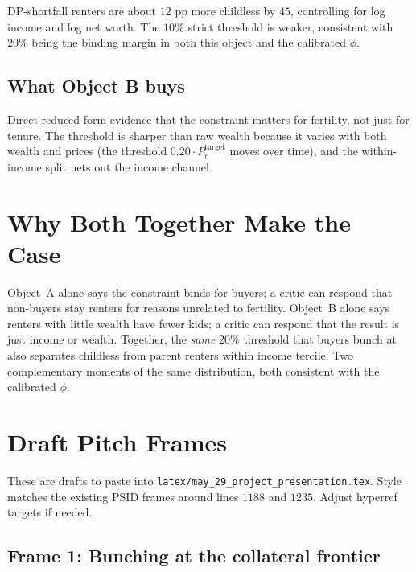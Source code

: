 \documentclass[11pt]{article}
\begin{document}
\noindent DP-shortfall renters are about $12$ pp more childless by $45$, controlling for log income and log net worth. The $10\%$ strict threshold is weaker, consistent with $20\%$ being the binding margin in both this object and the calibrated $\phi$.

\subsection*{What Object B buys}

Direct reduced-form evidence that the constraint matters for fertility, not just for tenure. The threshold is sharper than raw wealth because it varies with both wealth and prices (the threshold $0.20 \cdot P^{\mathrm{target}}_t$ moves over time), and the within-income split nets out the income channel.

\section{Why Both Together Make the Case}

Object~A alone says the constraint binds for buyers; a critic can respond that non-buyers stay renters for reasons unrelated to fertility. Object~B alone says renters with little wealth have fewer kids; a critic can respond that the result is just income or wealth. Together, the \emph{same} $20\%$ threshold that buyers bunch at also separates childless from parent renters within income tercile. Two complementary moments of the same distribution, both consistent with the calibrated $\phi$.

\section{Draft Pitch Frames}

These are drafts to paste into \texttt{latex/may\_29\_project\_presentation.tex}. Style matches the existing PSID frames around lines $1188$ and $1235$. Adjust hyperref targets if needed.

\subsection*{Frame 1: Bunching at the collateral frontier}
\end{document}
